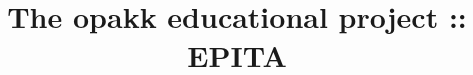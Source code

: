 %
%
%
%
%
%

%
%

%
%

\def\path{../..}

%
%



%
%


%
%

\title{The opakk educational project :: EPITA
       \version}

%
%



%
%

\maketitle

%
%


